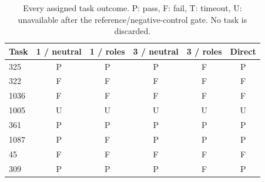 \begin{table}[htbp]
\centering\small
\caption{Every assigned task outcome. P: pass, F: fail, T: timeout, U: unavailable after the reference/negative-control gate. No task is discarded.}
\label{tab:codextasks}
\begin{tabular}{lccccc}
\toprule
Task & 1 / neutral & 1 / roles & 3 / neutral & 3 / roles & Direct \\
\midrule
325 & P & P & P & F & P \\
322 & F & F & F & F & F \\
1036 & F & F & F & F & F \\
1005 & U & U & U & U & U \\
361 & P & P & P & P & P \\
1087 & P & F & P & P & P \\
45 & F & F & F & F & F \\
309 & P & P & P & F & P \\
\bottomrule
\end{tabular}
\end{table}
